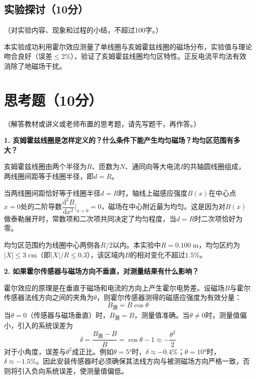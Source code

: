 \documentclass{Phyport}
\begin{document}
\subsection{实验探讨（10分）}
（对实验内容、现象和过程的小结，不超过100字。）

本实验成功利用霍尔效应测量了单线圈与亥姆霍兹线圈的磁场分布，实验值与理论吻合良好（误差$\leq$2\%），验证了亥姆霍兹线圈均匀区特性。正反电流平均法有效消除了地磁场干扰。

\section{思考题（10分）}
（解答教材或讲义或老师布置的思考题，请先写题干，再作答。）

\textbf{1. 亥姆霍兹线圈是怎样定义的？什么条件下能产生均匀磁场？均匀区范围有多大？}

亥姆霍兹线圈由两个半径为$R$、匝数为$N$、通同向等大电流$I$的共轴圆线圈组成，两线圈间距等于线圈半径，即$d = R$。

当两线圈间距恰好等于线圈半径$d = R$时，轴线上磁感应强度$B(x)$在中心点$x = 0$处的二阶导数$\dfrac{\mathrm{d}^2 B}{\mathrm{d}x^2}\bigg|_{x=0} = 0$，磁场在中心附近最为均匀。这是因为对$B(x)$做泰勒展开时，常数项和二次项共同决定了均匀程度，当$d = R$时二次项恰好为零。

均匀区范围约为线圈中心两侧各$R/2$以内。本实验中$R = 0.100\;\text{m}$，均匀区约为$|X| \leq 3\;\text{cm}$（即$|X|/R \leq 0.3$），该区域内$B$的相对变化不超过$1.5\%$。

\vspace{1em}

\textbf{2. 如果霍尔传感器与磁场方向不垂直，对测量结果有什么影响？}

霍尔效应的原理是在垂直于磁场和电流的方向上产生霍尔电势差。设磁场$B$与霍尔传感器法线方向之间的夹角为$\theta$，则霍尔传感器测得的磁感应强度为有效分量：
\begin{equation*}
    B_{\text{测}} = B \cos\theta
\end{equation*}
当$\theta = 0$（传感器与磁场垂直）时，$B_{\text{测}} = B$，测量值准确。当$\theta \neq 0$时，测量值偏小，引入的系统误差为
\begin{equation*}
    \delta = \frac{B_{\text{测}} - B}{B} = \cos\theta - 1 \approx -\frac{\theta^2}{2}
\end{equation*}
对于小角度，误差与$\theta^2$成正比。例如$\theta = 5°$时，$\delta \approx -0.4\%$；$\theta = 10°$时，$\delta \approx -1.5\%$。因此安装传感器时必须确保其法线方向与被测磁场方向严格一致，否则将引入负向系统误差，使测量值偏低。


\end{document}
